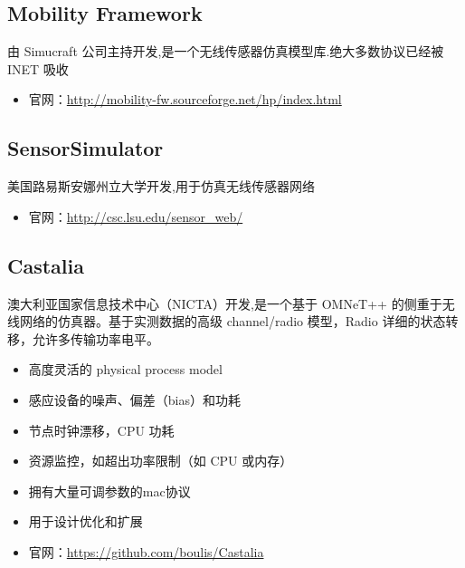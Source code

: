 \subsection{Mobility Framework}
\label{mobilityframework}

由 Simucraft 公司主持开发,是一个无线传感器仿真模型库.绝大多数协议已经被 INET 吸收

\begin{itemize}
\item 官网：\href{http://mobility-fw.sourceforge.net/hp/index.html}{http:\slash \slash mobility-fw.sourceforge.net\slash hp\slash index.html}

\end{itemize}

\subsection{SensorSimulator}
\label{sensorsimulator}

美国路易斯安娜州立大学开发,用于仿真无线传感器网络

\begin{itemize}
\item 官网：\href{http://csc.lsu.edu/sensor_web/}{http:\slash \slash csc.lsu.edu\slash sensor\_web\slash }

\end{itemize}

\subsection{Castalia}
\label{castalia}

澳大利亚国家信息技术中心（NICTA）开发,是一个基于 OMNeT++ 的侧重于无线网络的仿真器。基于实测数据的高级 channel\slash radio 模型，Radio 详细的状态转移，允许多传输功率电平。

\begin{itemize}
\item 高度灵活的 physical process model

\item 感应设备的噪声、偏差（bias）和功耗

\item 节点时钟漂移，CPU 功耗

\item 资源监控，如超出功率限制（如 CPU 或内存）

\item 拥有大量可调参数的mac协议

\item 用于设计优化和扩展

\item 官网：\href{https://github.com/boulis/Castalia}{https:\slash \slash github.com\slash boulis\slash Castalia}

\end{itemize}

